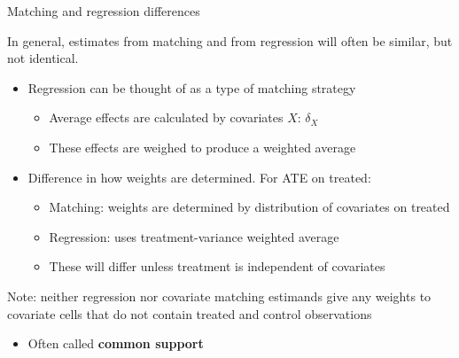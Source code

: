 \documentclass[compress, 8pt]{beamer}
\begin{document}
\begin{frame}{Matching and regression differences}

In general, estimates from matching and from regression will often be similar, but not identical.
\begin{itemize}
    \item Regression can be thought of as a type of matching strategy
    \begin{itemize}
        \item Average effects are calculated by covariates $X$: $\delta_X$
        \item These effects are weighed to produce a weighted average
    \end{itemize}

    \item Difference in how weights are determined. For ATE on treated:
    \begin{itemize}
        \item Matching: weights are determined by distribution of covariates on treated
        \item Regression: uses treatment-variance weighted average
        \item These will differ unless treatment is independent of covariates
    \end{itemize}

\end{itemize}

\vspace{3ex}
Note: neither regression nor covariate matching estimands give any weights to covariate cells that do not contain treated and control observations
\begin{itemize}
    \item Often called \textbf{common support}
\end{itemize}
\end{frame}
\end{document}
